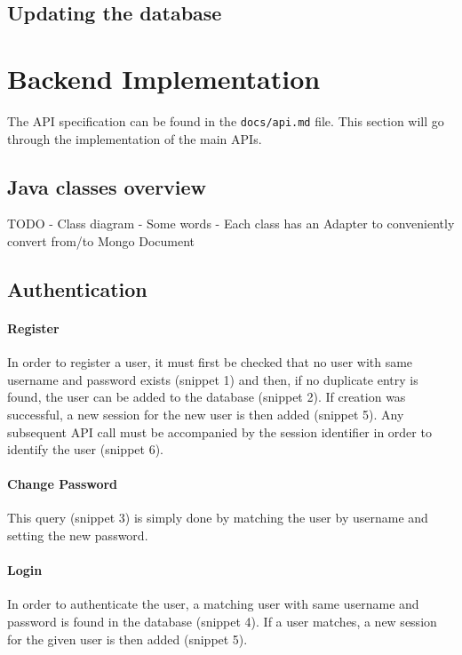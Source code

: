 \documentclass[11pt]{article}
\begin{document}
\subsection{Updating the database}


\section{Backend Implementation}
The API specification can be found in the \texttt{docs/api.md} file. This section will go through the implementation of the main APIs. 

\subsection{Java classes overview}
TODO
 - Class diagram
 - Some words
 - Each class has an Adapter to conveniently convert from/to Mongo Document

\subsection{Authentication}

\paragraph{Register}
In order to register a user, it must first be checked that no user with same username and password exists (snippet 1) and then, if no duplicate entry is found, the user can be added to the database (snippet 2). If creation was successful, a new session for the new user is then added (snippet 5). Any subsequent API call must be accompanied by the session identifier in order to identify the user (snippet 6).

\paragraph{Change Password}
This query (snippet 3) is simply done by matching the user by username and setting the new password.

\paragraph{Login}
In order to authenticate the user, a matching user with same username and password is found in the database (snippet 4). If a user matches, a new session
for the given user is then added (snippet 5).
\end{document}
